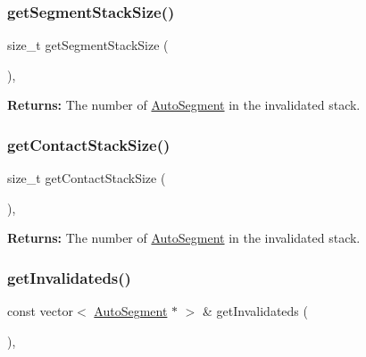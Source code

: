 \subsubsection{\texorpdfstring{get\+Segment\+Stack\+Size()}{getSegmentStackSize()}}
{\footnotesize\ttfamily size\+\_\+t get\+Segment\+Stack\+Size (\begin{DoxyParamCaption}{ }\end{DoxyParamCaption})\hspace{0.3cm}{\ttfamily [inline]}, {\ttfamily [static]}}

{\bfseries Returns\+:} The number of \hyperlink{classKatabatic_1_1AutoSegment}{Auto\+Segment} in the invalidated stack. \mbox{\label{classKatabatic_1_1Session_a0d0c0159030a32b78ab4ad2b58871bce}} 
\subsubsection{\texorpdfstring{get\+Contact\+Stack\+Size()}{getContactStackSize()}}
{\footnotesize\ttfamily size\+\_\+t get\+Contact\+Stack\+Size (\begin{DoxyParamCaption}{ }\end{DoxyParamCaption})\hspace{0.3cm}{\ttfamily [inline]}, {\ttfamily [static]}}

{\bfseries Returns\+:} The number of \hyperlink{classKatabatic_1_1AutoSegment}{Auto\+Segment} in the invalidated stack. \mbox{\label{classKatabatic_1_1Session_a6060b7e972f3c0d10cfa158b5ed174e6}} 
\subsubsection{\texorpdfstring{get\+Invalidateds()}{getInvalidateds()}}
{\footnotesize\ttfamily const vector$<$ \hyperlink{classKatabatic_1_1AutoSegment}{Auto\+Segment} $\ast$ $>$ \& get\+Invalidateds (\begin{DoxyParamCaption}{ }\end{DoxyParamCaption})\hspace{0.3cm}{\ttfamily [inline]}, {\ttfamily [static]}}


